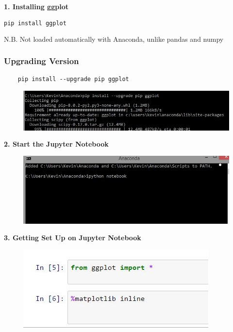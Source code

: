 \documentclass{beamer}
\begin{document}
\begin{frame}[fragile]
\textbf{1. Installing ggplot}
\begin{framed}
\begin{verbatim}
pip install ggplot
\end{verbatim}
\end{framed}
N.B. Not loaded automatically with Anaconda, unlike pandas and numpy
\end{frame}
\begin{frame}[fragile]
	\frametitle{Upgrading Version}
	\large
	\begin{verbatim}
	pip install --upgrade pip ggplot
	\end{verbatim}
	
	\begin{figure}
		\centering
		\includegraphics[width=1.1\linewidth]{setup3}
	\end{figure}
	
\end{frame}
\begin{frame}
\textbf{2. Start the Jupyter Notebook}
	\begin{figure}
		\centering
		\includegraphics[width=1.1\linewidth]{setup2}
	\end{figure}
	
\end{frame}
\begin{frame}
\textbf{3. Getting Set Up on Jupyter Notebook}
\begin{figure}
\centering
\includegraphics[width=0.7\linewidth]{jupyter1}
\end{figure}

\end{frame}
\end{document}
